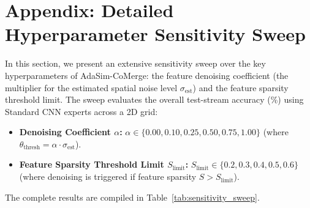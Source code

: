\documentclass{article}
\theoremstyle{plain}
\theoremstyle{definition}
\theoremstyle{remark}
\begin{document}
\nocite{*}



\clearpage
\appendix
\section{Appendix: Detailed Hyperparameter Sensitivity Sweep}
\label{sec:appendix}

In this section, we present an extensive sensitivity sweep over the key hyperparameters of AdaSim-CoMerge: the feature denoising coefficient (the multiplier for the estimated spatial noise level $\sigma_{\text{est}}$) and the feature sparsity threshold limit. The sweep evaluates the overall test-stream accuracy (\%) using Standard CNN experts across a 2D grid:
\begin{itemize}
    \item \textbf{Denoising Coefficient $\alpha$:} $\alpha \in \{0.00, 0.10, 0.25, 0.50, 0.75, 1.00\}$ (where $\theta_{\text{thresh}} = \alpha \cdot \sigma_{\text{est}}$).
    \item \textbf{Feature Sparsity Threshold Limit $S_{\text{limit}}$:} $S_{\text{limit}} \in \{0.2, 0.3, 0.4, 0.5, 0.6\}$ (where denoising is triggered if feature sparsity $S > S_{\text{limit}}$).
\end{itemize}

The complete results are compiled in Table~\ref{tab:sensitivity_sweep}.

\begin{table}[h]
\centering
\caption{Overall test-stream accuracy (\%) of AdaSim-CoMerge under varying denoising coefficients $\alpha$ and feature sparsity limits $S_{\text{limit}}$ on Standard CNN experts.}
\label{tab:sensitivity_sweep}
\end{table}
\end{document}
